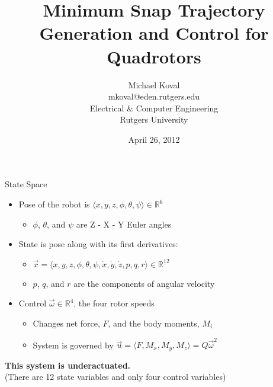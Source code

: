 \documentclass[onlymath]{beamer}
\title{
    Minimum Snap Trajectory Generation and Control for Quadrotors
}
\author{
    Michael Koval \\
    mkoval@eden.rutgers.edu \\
    Electrical \& Computer Engineering \\
    Rutgers University
}
\date{April 26, 2012}
\begin{document}
\begin{frame}
\titlepage
\end{frame}

\begin{frame}{State Space}
\begin{itemize}
\item Pose of the robot is $\langle x, y, z, \phi, \theta, \psi \rangle \in
      \mathbb{R}^6$
    \begin{itemize}
    \item $\phi$, $\theta$, and $\psi$ are Z - X - Y Euler angles
    \end{itemize}
\item State is pose along with its first derivatives:
    \begin{itemize}
    \item $\vec{x} = \langle x, y, z, \phi, \theta, \psi, \dot{x}, \dot{y},
          \dot{z}, p , q, r \rangle \in \mathbb{R}^{12}$
    \item $p$, $q$, and $r$ are the components of angular velocity
    \end{itemize}
\item Control $\vec{\omega} \in \mathbb{R}^4$, the four rotor speeds
    \begin{itemize}
    \item Changes net force, $F$, and the body moments, $M_i$
    \item System is governed by $\vec{u} = \langle F, M_x, M_y, M_z \rangle
          = Q \vec{\omega}^2$
    \end{itemize}
\end{itemize}
\begin{center}
    \textbf{This system is underactuated.} \\
    \small
    (There are 12 state variables and only four control variables)
\end{center}
\end{frame}
\end{document}

